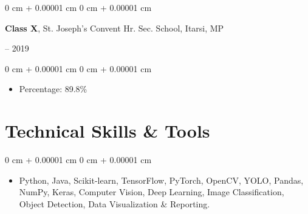 \documentclass[10pt, letterpaper]{article}
\newenvironment{highlights}{
    \begin{itemize}[
        topsep=0.10 cm,
        parsep=0.10 cm,
        partopsep=0pt,
        itemsep=0pt,
        leftmargin=0 cm + 10pt
    ]
}{
    \end{itemize}
} %
\newenvironment{onecolentry}{
    \begin{adjustwidth}{
        0 cm + 0.00001 cm
    }{
        0 cm + 0.00001 cm
    }
}{
    \end{adjustwidth}
} %
\newenvironment{twocolentry}[2][]{
    \onecolentry
    \def\secondColumn{#2}
    \setcolumnwidth{\fill, 4.5 cm}
    \begin{paracol}{2}
}{
    \switchcolumn \raggedleft \secondColumn
    \end{paracol}
    \endonecolentry
} %
\begin{document}
    \begin{twocolentry}{2018 -- 2019}
        \textbf{Class X}, St. Joseph’s Convent Hr. Sec. School, Itarsi, MP
    \end{twocolentry}
    \begin{onecolentry}\begin{highlights}\item Percentage: 89.8\%\end{highlights}\end{onecolentry}

    \section{Technical Skills \& Tools}
    \begin{onecolentry}
        \begin{highlights}
            \item Python, Java, Scikit-learn, TensorFlow, PyTorch, OpenCV, YOLO, Pandas, NumPy, Keras, Computer Vision, Deep Learning, Image Classification, Object Detection, Data Visualization \& Reporting.
        \end{highlights}
    \end{onecolentry}
\end{document}
